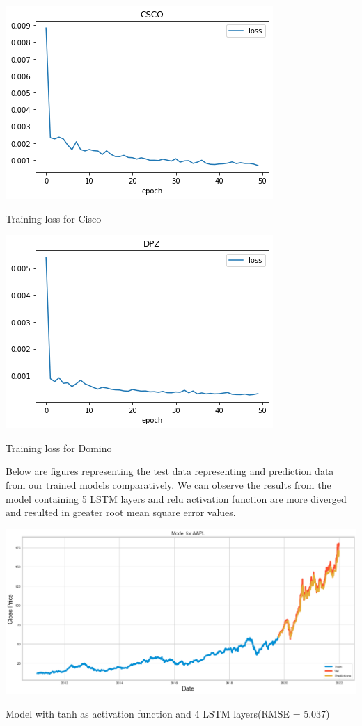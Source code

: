 \begin{center}
    \includegraphics[scale=0.50]{loss_CSCO.png}
    \newline
    \caption{Training loss for Cisco}
\end{center}

\begin{center}
    \includegraphics[scale=0.50]{loss_DPZ.png}
    \newline
    \caption{Training loss for Domino}
\end{center}

Below are figures representing the test data representing and prediction data from our trained models comparatively. We can observe the results from the model containing 5 LSTM layers and relu activation function are more diverged and resulted in greater root mean square error values.

\begin{center}
    \includegraphics[width=\textwidth]{AAPL_results_01.png}
    \caption{Model with tanh as activation function and 4 LSTM layers(RMSE = 5.037)}
\end{center}

